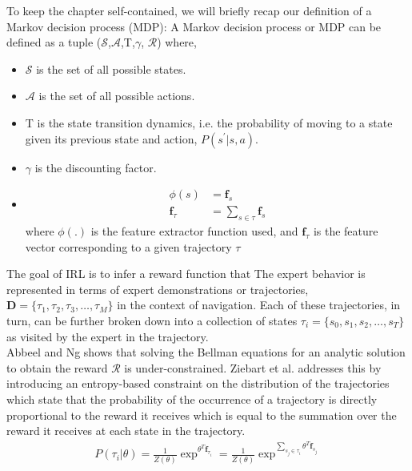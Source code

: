 To keep the chapter self-contained, we will briefly recap our definition of a Markov decision process (MDP):
A Markov decision process or MDP can be defined as a tuple ($\mathcal{S}$,$\mathcal{A}$,T,$\gamma$, $\mathcal{R}$)  where,
\begin{itemize}
    \item $\mathcal{S}$ is the set of all possible states.
    \item $\mathcal{A}$ is the set of all possible actions.
    \item T is the state transition dynamics, i.e. the probability of moving to a state given its previous state and action, $P(s^{'}|s, a)$.
    \item $\gamma$ is the discounting factor.
    \item {}
    \begin{align}
    \phi(s) &= \mathbf{f}_{s} \\
    \mathbf{f}_{\tau} &= \sum_{s \in \tau} \mathbf{f}_{s}
    \end{align}
    where $\phi(.)$ is the feature extractor function used, and $\mathbf{f}_{\tau}$ is the feature vector corresponding to a given trajectory $\tau$ 
    \end{itemize}  
The goal of IRL is to infer a reward function that  The expert behavior is represented in terms of expert demonstrations or trajectories, $\mathbf{D} = \{ \tau_1, \tau_2, \tau_3, \dots, 
\tau_{M} \}$ in the context of navigation. Each of these trajectories, in turn, can be further broken down into a collection of states $\tau_{i} = \{ s_{0}, s_{1}, s_{2}, \dots, s_{T} \}$ as visited by the expert in the trajectory. \\ Abbeel and Ng
\cite{abbeel_apprenticeshiplearning_2004} shows that solving the Bellman equations for an analytic solution to obtain the reward $\mathcal{R}$ is under-constrained. Ziebart et al. \cite{ziebart_maxent_2008} addresses this by introducing an entropy-based constraint \cite{jaynes1957information} on the distribution of the trajectories which state that the probability of the occurrence of a trajectory is directly proportional to the reward it receives which is equal to the summation over the reward it receives at each state in the trajectory.
\begin{align}
P(\tau_{i}| \theta) = \frac{1}{Z(\theta)}\exp^{\theta^{T}\mathbf{f}_{\tau_{i}}} = \frac{1}{Z(\theta)}\exp^{\sum_{s_{j}\in\tau_{i}}\theta^{T}\mathbf{f}_{s_{j}}}
\end{align}
